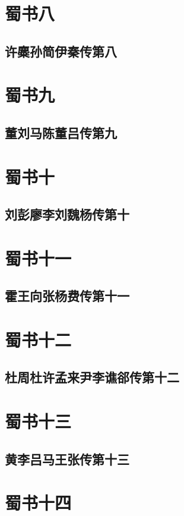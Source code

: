 \documentclass[12pt,UTF8]{ctexbook}
\begin{document}
\part{蜀书八}
\chapter{许麋孙简伊秦传第八}

\part{蜀书九}
\chapter{董刘马陈董吕传第九}

\part{蜀书十}
\chapter{刘彭廖李刘魏杨传第十}

\part{蜀书十一}
\chapter{霍王向张杨费传第十一}

\part{蜀书十二}
\chapter{杜周杜许孟来尹李谯郤传第十二}

\part{蜀书十三}
\chapter{黄李吕马王张传第十三}

\part{蜀书十四}
\end{document}
